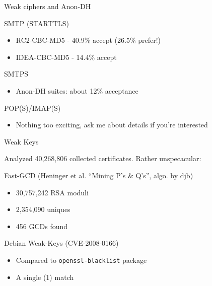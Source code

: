 \begin{frame}{Weak ciphers and Anon-DH}

\begin{block}{SMTP (STARTTLS)}

\begin{itemize}
\itemsep1pt\parskip0pt
\item
  RC2-CBC-MD5 - 40.9\% accept (26.5\% prefer!)
\item
  IDEA-CBC-MD5 - 14.4\% accept
\end{itemize}

\end{block}

\begin{block}{SMTPS}

\begin{itemize}
\itemsep1pt\parskip0pt
\item
  Anon-DH suites: about 12\% acceptance
\end{itemize}

\end{block}

\begin{block}{POP(S)/IMAP(S)}

\begin{itemize}
\itemsep1pt\parskip0pt
\item
  Nothing too exciting, ask me about details if you're interested
\end{itemize}

\end{block}

\end{frame}

\begin{frame}{Weak Keys}

Analyzed 40,268,806 collected certificates. Rather unspecacular:

\begin{block}{Fast-GCD (Heninger et al. ``Mining P's \& Q's'', algo. by
djb)}

\begin{itemize}
\itemsep1pt\parskip0pt
\item
  30,757,242 RSA moduli
\item
  2,354,090 uniques
\item
  456 GCDs found
\end{itemize}

\end{block}

\begin{block}{Debian Weak-Keys (CVE-2008-0166)}

\begin{itemize}
\itemsep1pt\parskip0pt
\item
  Compared to \texttt{openssl-blacklist} package
\item
  A single (1) match
\end{itemize}

\end{block}

\end{frame}

